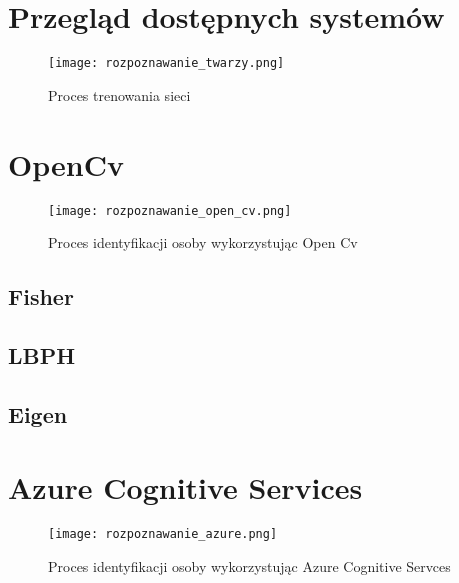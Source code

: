 \section{Przegląd dostępnych systemów}
\begin{figure}[H]
	\centering
	\texttt{[image: rozpoznawanie\_twarzy.png]}
	\caption{Proces trenowania sieci}
	\label{fig:rozpoznawanie_proces}
\end{figure}
\section{OpenCv}
\begin{figure}[H]
	\centering
	\texttt{[image: rozpoznawanie\_open\_cv.png]}
	\caption{Proces identyfikacji osoby wykorzystując Open Cv}
	\label{fig:rozpoznawanie_open_cv}
\end{figure}
\subsection{Fisher}
\subsection{LBPH}
\subsection{Eigen}
\section{Azure Cognitive Services}
\begin{figure}[H]
	\centering
	\texttt{[image: rozpoznawanie\_azure.png]}
	\caption{Proces identyfikacji osoby wykorzystując Azure Cognitive Servces}
	\label{fig:rozpoznawanie_open_cv}
\end{figure}